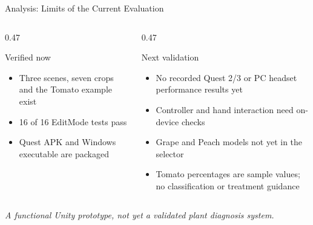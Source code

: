\documentclass[aspectratio=169,11pt]{beamer}
\begin{document}
\begin{frame}{Analysis: Limits of the Current Evaluation}
  \begin{columns}[T]
    \begin{column}{0.47\textwidth}
      \begin{exampleblock}{Verified now}
        \begin{itemize}\small
          \item Three scenes, seven crops and the Tomato example exist
          \item 16 of 16 EditMode tests pass
          \item Quest APK and Windows executable are packaged
        \end{itemize}
      \end{exampleblock}
    \end{column}
    \begin{column}{0.47\textwidth}
      \begin{alertblock}{Next validation}
        \begin{itemize}\small
          \item No recorded Quest 2/3 or PC headset performance results yet
          \item Controller and hand interaction need on-device checks
          \item Grape and Peach models not yet in the selector
          \item Tomato percentages are sample values; no classification or treatment guidance
        \end{itemize}
      \end{alertblock}
    \end{column}
  \end{columns}
  \vspace{1em}
  \centering\textit{A functional Unity prototype, not yet a validated plant diagnosis system.}
\end{frame}
\end{document}
